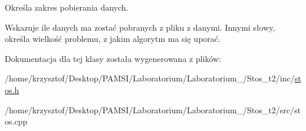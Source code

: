 \-Określa zakres pobierania danych. 

\-Wskazuje ile danych ma zostać pobranych z pliku z danymi. \-Innymi słowy, określa wielkość problemu, z jakim algorytm ma się uporać. 

\-Dokumentacja dla tej klasy została wygenerowana z plików\-:\begin{DoxyCompactItemize}
\item 
/home/krzysztof/\-Desktop/\-P\-A\-M\-S\-I/\-Laboratorium/\-Laboratorium\-\_/\-Stos\-\_\-t2/inc/\hyperlink{stos_8h}{stos.\-h}\item 
/home/krzysztof/\-Desktop/\-P\-A\-M\-S\-I/\-Laboratorium/\-Laboratorium\-\_/\-Stos\-\_\-t2/src/stos.\-cpp\end{DoxyCompactItemize}
